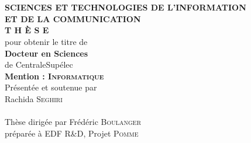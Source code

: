 \begin{titlepage}
\begin{center}
 \\
\vspace*{0.3cm}
 \\
\noindent \textbf{SCIENCES ET TECHNOLOGIES DE L'INFORMATION \\ ET DE LA COMMUNICATION} \\
\vspace*{0.5cm}
\noindent \Huge \textbf{T H È S E} \\
\vspace*{0.3cm}
\noindent \large {pour obtenir le titre de} \\
\vspace*{0.3cm}
\noindent \LARGE \textbf{Docteur en Sciences} \\
\vspace*{0.3cm}
\noindent \Large de CentraleSupélec \\
\noindent \Large \textbf{Mention : \textsc{Informatique}}\\
\vspace*{0.4cm}
\noindent \large {Présentée et soutenue par\\}
\noindent \LARGE Rachida \textsc{Seghiri} \\
\vspace*{0.8cm}
 \\
\vspace*{0.8cm}
\noindent \Large Thèse dirigée par Frédéric \textsc{Boulanger} \\
\vspace*{0.2cm}
\noindent \Large préparée à EDF R&D, Projet \textsc{Pomme} \\
\vspace*{0.2cm}
\noindent \large   \\
\vspace*{0.5cm}
\end{center}
\end{titlepage}
\sloppy

\titlepage

